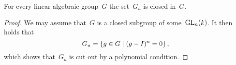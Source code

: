 \begin{lemma}
  \label{Gu is closed}
  For every linear algebraic group~$G$ the set~$G_u$ is closed in~$G$.
\end{lemma}


\begin{proof}
  We may assume that~$G$ is a closed subgroup of some~$\operatorname{GL}_n(k)$.
  It then holds that
  \[
      G_u
    = \{ g \in G \suchthat (g - I)^n = 0 \} \,,
  \]
  which shows that~$G_u$ is cut out by a polynomial condition.
\end{proof}






